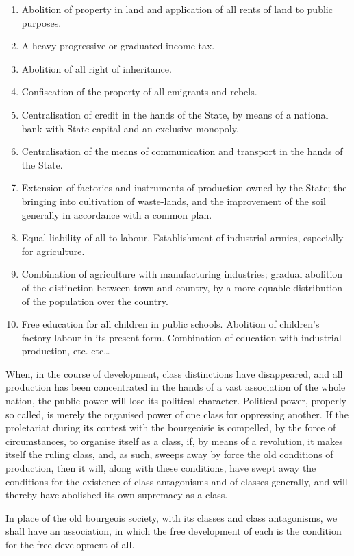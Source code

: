 \documentclass[, oneside]{article}   	%
\begin{document}
\begin{enumerate}
\item Abolition of property in land and application of all rents of land to public purposes.
\item A heavy progressive or graduated income tax.
\item Abolition of all right of inheritance.
\item Confiscation of the property of all emigrants and rebels.
\item Centralisation of credit in the hands of the State, by means of a national bank with State capital and an exclusive monopoly.
\item Centralisation of the means of communication and transport in the hands of the State.
\item Extension of factories and instruments of production owned by the State; the bringing into cultivation of waste-lands, and the improvement of the soil generally in accordance with a common plan.
\item Equal liability of all to labour. Establishment of industrial armies, especially for agriculture.
\item Combination of agriculture with manufacturing industries; gradual abolition of the distinction between town and country, by a more equable distribution of the population over the country.
\item Free education for all children in public schools. Abolition of children's factory labour in its present form. Combination of education with industrial production, etc. etc\ldots
\end{enumerate}

When, in the course of development, class distinctions have disappeared, and all production has been concentrated in the hands of a vast association of the whole nation, the public power will lose its political character. Political power, properly so called, is merely the organised power of one class for oppressing another. If the proletariat during its contest with the bourgeoisie is compelled, by the force of circumstances, to organise itself as a class, if, by means of a revolution, it makes itself the ruling class, and, as such, sweeps away by force the old conditions of production, then it will, along with these conditions, have swept away the conditions for the existence of class antagonisms and of classes generally, and will thereby have abolished its own supremacy as a class.

In place of the old bourgeois society, with its classes and class antagonisms, we shall have an association, in which the free development of each is the condition for the free development of all.
\end{document}

